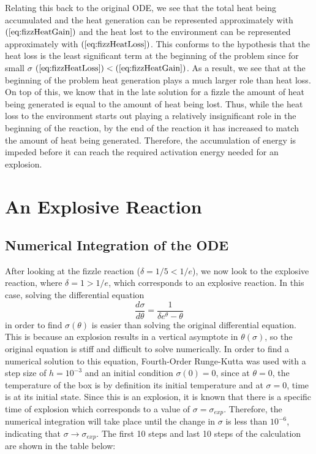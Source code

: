 \documentclass[12pt]{article}\pagestyle{myheadings}
\theoremstyle{plain}
\begin{document}
Relating this back to the original ODE, we see that the total heat being accumulated and the heat generation can be represented approximately with $(\ref{eq:fizzHeatGain})$ and the heat lost to the environment can be represented  approximately with $(\ref{eq:fizzHeatLoss})$. This conforms to the hypothesis that the heat loss is the least significant term at the beginning of the problem since for small $\sigma$ $(\ref{eq:fizzHeatLoss}) < (\ref{eq:fizzHeatGain})$. As a result, we see that at the beginning of the problem heat generation plays a much larger role than heat loss. On top of this, we know that in the late solution for a fizzle the amount of heat being generated is equal to the amount of heat being lost. Thus, while the heat loss to the environment starts out playing a relatively insignificant role in the beginning of the reaction, by the end of the reaction it has increased to match the amount of heat being generated. Therefore, the accumulation of energy is impeded before it can reach the required activation energy needed for an explosion.


\section{An Explosive Reaction}

\subsection{Numerical Integration of the ODE}

After looking at the fizzle reaction ($\delta = 1/5 < 1/e $), we now look to the explosive reaction, where $\delta = 1 > 1/e$, which corresponds to an explosive reaction. In this case, solving the differential equation {\[ \frac{d\sigma}{d\theta} = \frac{1}{\delta e^{\theta} - \theta} \]}in order to find $\sigma(\theta)$ is easier than solving the original differential equation. This is because an explosion results in a vertical asymptote in $\theta(\sigma)$, so the original equation is stiff and difficult to solve numerically. In order to find a numerical solution to this equation, Fourth-Order Runge-Kutta was used with a step size of $h = 10^{-3}$ and an initial condition $\sigma(0) = 0$, since at $\theta = 0$, the temperature of the box is by definition its initial temperature and at $\sigma = 0$, time is at its initial state. Since this is an explosion, it is known that there is a specific time of explosion which corresponds to a value of $\sigma = \sigma_{exp}$. Therefore, the numerical integration will take place until the change in $\sigma$ is less than $10^{-6}$, indicating that $\sigma \rightarrow \sigma_{exp}$. The first 10 steps and last 10 steps of the calculation are shown in the table below:
\end{document}
